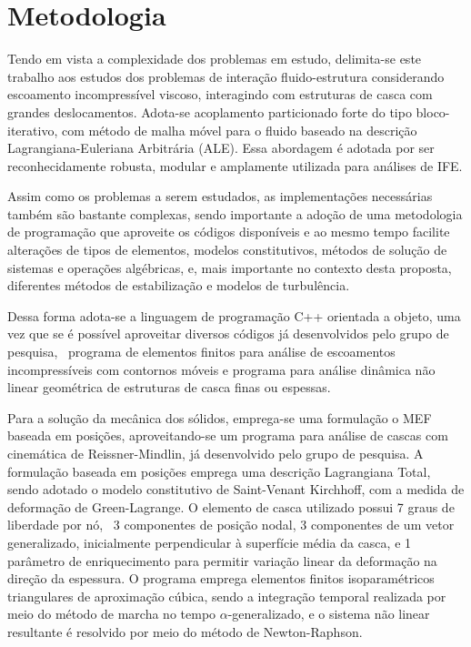 \chapter{Metodologia} \label{MetodologiaCronograma}

Tendo em vista a complexidade dos problemas em estudo, delimita-se este trabalho aos estudos dos problemas de interação fluido-estrutura considerando escoamento incompressível viscoso, interagindo com estruturas de casca com grandes deslocamentos. Adota-se acoplamento particionado forte do tipo bloco-iterativo, com método de malha móvel para o fluido baseado na descrição Lagrangiana-Euleriana Arbitrária (ALE). Essa abordagem é adotada por ser reconhecidamente robusta, modular e amplamente utilizada para análises de IFE.

Assim como os problemas a serem estudados, as implementações necessárias também são bastante complexas, sendo importante a adoção de uma metodologia de programação que aproveite os códigos disponíveis e ao mesmo tempo facilite alterações de tipos de elementos, modelos constitutivos, métodos de solução de sistemas e operações algébricas, e, mais importante no contexto desta proposta, diferentes métodos de estabilização e modelos de turbulência.

Dessa forma adota-se a linguagem de programação C++ orientada a objeto, uma vez que se é possível aproveitar diversos códigos já desenvolvidos pelo grupo de pesquisa, \ie\ programa de elementos finitos para análise de escoamentos incompressíveis com contornos móveis e programa para análise dinâmica não linear geométrica de estruturas de casca finas ou espessas.

Para a solução da mecânica dos sólidos, emprega-se uma formulação o MEF baseada em posições, aproveitando-se um programa para análise de cascas com cinemática de Reissner-Mindlin, já desenvolvido pelo grupo de pesquisa. A formulação baseada em posições emprega uma descrição Lagrangiana Total, sendo adotado o modelo constitutivo de Saint-Venant Kirchhoff, com a medida de deformação de Green-Lagrange. O elemento de casca utilizado possui 7 graus de liberdade por nó, \ie\ 3 componentes de posição nodal, 3 componentes de um vetor generalizado, inicialmente perpendicular à superfície média da casca, e 1 parâmetro de enriquecimento para permitir variação linear da deformação na direção da espessura. O programa emprega elementos finitos isoparamétricos triangulares de aproximação cúbica, sendo a integração temporal realizada por meio do método de marcha no tempo $\alpha$-generalizado, e o sistema não linear resultante é resolvido por meio do método de Newton-Raphson.%

